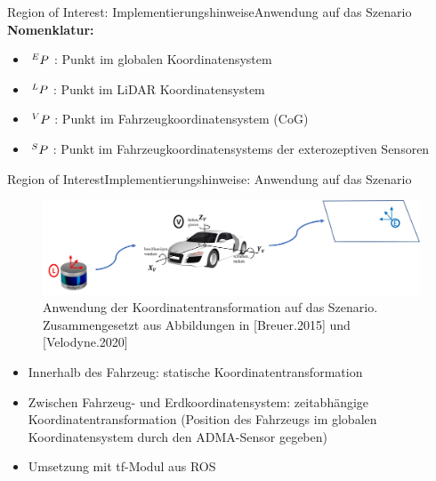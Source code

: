 \documentclass[169, handout	]{THIbeamer} %
\begin{document}
	\begin{frame}{Region of Interest: Implementierungshinweise}{Anwendung auf das Szenario}
		\textbf{Nomenklatur:} 
		\begin{itemize}
			\item $\hspace*{0.2em}^E\vspace*{-0.2em}P$ : Punkt im globalen Koordinatensystem
			\item $\hspace*{0.2em}^L\vspace*{-0.2em}P$ : Punkt im LiDAR Koordinatensystem
			\item $\hspace*{0.2em}^V\vspace*{-0.2em}P$ : Punkt im Fahrzeugkoordinatensystem (CoG)
			\item $\hspace*{0.2em}^{S}\vspace*{-0.2em}P$ : Punkt im Fahrzeugkoordinatensystems der exterozeptiven Sensoren
		\end{itemize}
	\end{frame}
	\begin{frame}{Region of Interest}{Implementierungshinweise: Anwendung auf das Szenario}
		\begin{figure}
			\includegraphics[scale=0.5]{required/Szenarioanwendung Koordinatentransformation.jpg}
			\caption{Anwendung der Koordinatentransformation auf das Szenario. Zusammengesetzt aus Abbildungen in [Breuer.2015] und [Velodyne.2020]}
        	\label{Globales Koordinatensystem}
       	\end{figure}
       	\footnotesize
       	\begin{itemize}
       		\item Innerhalb des Fahrzeug: statische Koordinatentransformation 
       		\item Zwischen Fahrzeug- und Erdkoordinatensystem: zeitabhängige Koordinatentransformation (Position des Fahrzeugs im globalen Koordinatensystem durch den ADMA-Sensor gegeben)
			\item Umsetzung mit tf-Modul aus ROS
       	\end{itemize}
	\end{frame}
\end{document}
